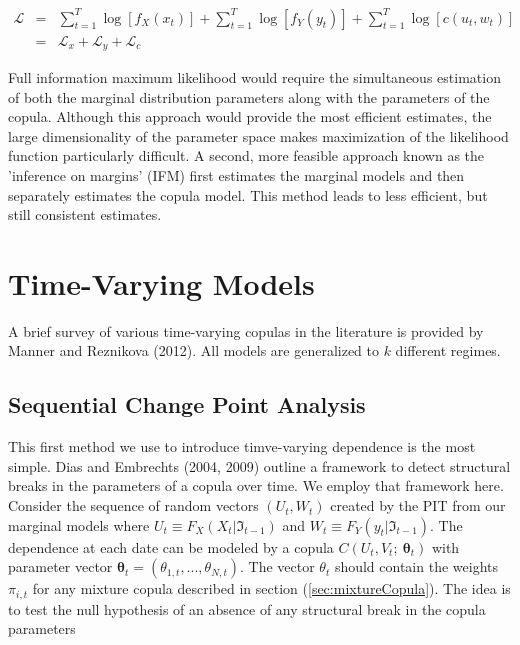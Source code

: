\documentclass[12pt]{article}
\newcommand{\Lagr}{\mathcal{L}}
\begin{document}
\begin{eqnarray*}
\Lagr &=& \sum\nolimits_{t=1}^{T}\log \left[f_{X}\left(x_{t}\right)\right] + \sum\nolimits_{t=1}^{T}\log \left[f_{Y}\left(y_{t}\right)\right]
+ \sum\nolimits_{t=1}^{T}\log \left[c\left(u_{t}, w_{t}\right)\right] \\
    &=& \Lagr_{x} + \Lagr_{y} + \Lagr_{c}
\end{eqnarray*}

Full information maximum likelihood would require the simultaneous
estimation of both the marginal distribution parameters along with the
parameters of the copula. Although this approach would provide the most
efficient estimates, the large dimensionality of the parameter space makes
maximization of the likelihood function particularly difficult. A second,
more feasible approach known as the 'inference on margins' (IFM) first
estimates the marginal models and then separately estimates the copula
model. This method leads to less efficient, but still consistent estimates.

\section{Time-Varying Models}

A brief survey of various time-varying copulas in the literature is
provided by Manner and Reznikova (2012). All models are generalized to
$k$ different regimes.

\subsection{Sequential Change Point Analysis}

This first method we use to introduce timve-varying dependence is the most
simple. Dias and Embrechts (2004, 2009) outline a framework to detect
structural breaks in the parameters of a copula over time. We employ that
framework here. Consider the sequence of random vectors
$\left(U_{t}, W_{t}\right)$ created by the PIT from our marginal models
where $U_{t}\equiv F_{X}\left(X_{t}|\Im_{t-1}\right)$ and
$W_{t}\equiv F_{Y}\left(y_{t} | \Im_{t-1}\right)$. The dependence at each
date can be modeled by a copula
$C\left(U_{t}, V_{t};~\boldsymbol{\theta}_{t}\right)$ with parameter
vector $\boldsymbol{\theta}_{t}=(\theta_{1,t},...,\theta_{N,t})$. The
vector $\theta_{t}$ should contain the weights $\pi _{i,t}$ for any
mixture copula described in section (\ref{sec:mixtureCopula}). The idea
is to test the null hypothesis of an absence of any structural break in
the copula parameters
\end{document}
